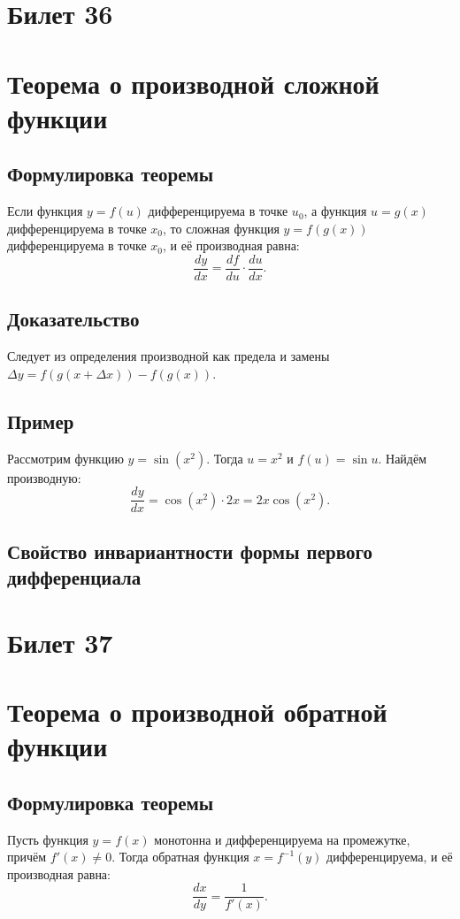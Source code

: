 \documentclass{article}
\begin{document}
\section{Билет 36}

\section*{Теорема о производной сложной функции}

\subsection{Формулировка теоремы}
Если функция \( y = f(u) \) дифференцируема в точке \( u_0 \), а функция \( u = g(x) \) дифференцируема в точке \( x_0 \), то сложная функция \( y = f(g(x)) \) дифференцируема в точке \( x_0 \), и её производная равна:
\[
\frac{dy}{dx} = \frac{df}{du} \cdot \frac{du}{dx}.
\]

\subsection{Доказательство}
Следует из определения производной как предела и замены \( \Delta y = f(g(x + \Delta x)) - f(g(x)) \).

\subsection{Пример}
Рассмотрим функцию \( y = \sin(x^2) \). Тогда \( u = x^2 \) и \( f(u) = \sin u \). Найдём производную:
\[
\frac{dy}{dx} = \cos(x^2) \cdot 2x = 2x \cos(x^2).
\]

\subsection{Свойство инвариантности формы первого дифференциала}

\section{Билет 37}

\section*{Теорема о производной обратной функции}

\subsection{Формулировка теоремы}
Пусть функция \( y = f(x) \) монотонна и дифференцируема на промежутке, причём \( f'(x) \neq 0 \). Тогда обратная функция \( x = f^{-1}(y) \) дифференцируема, и её производная равна:
\[
\frac{dx}{dy} = \frac{1}{f'(x)}.
\]
\end{document}
